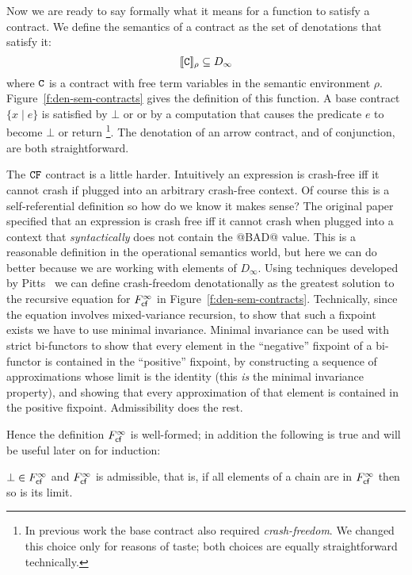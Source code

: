 Now we are ready to say formally what it means for a function to satisfy a contract.
We define the semantics of a contract as the set of denotations that satisfy it:
\[              [\![{\tt C}]\!]_\rho \subseteq D_\infty  \]
where ${\tt C}$ is a contract with free term variables in the semantic environment $\rho$.
Figure~\ref{f:den-sem-contracts} gives the definition of this function.
A base contract $\{x \mid e\}$ is satisfied by $\bot$ or
or by a computation that causes the predicate $e$ to become $\bot$
or return \True\footnote{
In previous
work \cite{xu+:contracts} the base contract also
required {\em crash-freedom}.
We changed this choice only for reasons of taste; both choices
are equally straightforward technically.}.
The denotation of an arrow contract, and of conjunction, are both straightforward.

The ${\tt CF}$ contract is a little harder. Intuitively an expression is crash-free iff it cannot
crash if plugged into an arbitrary crash-free context. Of course this is a
self-referential definition so how do we know it makes sense? The original paper
\cite{xu+:contracts} specified that an expression is crash free iff it
cannot crash when plugged into a context that {\em syntactically} does not contain the
@BAD@ value. This is a reasonable definition in the operational semantics world, but
here we can do better because we are working with elements of $D_\infty$. Using
techniques developed by Pitts~\cite{pitts-rel-domains} we can define crash-freedom denotationally as the greatest solution
to the recursive equation for $F_{\textsf{cf}}^{\infty}$ in Figure~\ref{f:den-sem-contracts}. Technically,
since the equation involves mixed-variance recursion, to show that such a fixpoint 
exists we have to use minimal invariance. Minimal invariance can be used
with strict bi-functors to show that every element in the ``negative'' fixpoint
of a bi-functor is contained in the ``positive'' fixpoint, by constructing a sequence of 
approximations whose limit is the identity (this {\em is} the minimal invariance property),
and showing that every approximation of that element is contained in the 
positive fixpoint. Admissibility does the rest.

Hence the definition $F_{\textsf{cf}}^{\infty}$ is well-formed; in addition 
the following is true and will be useful later on for induction:
\begin{lemma}\label{lem:cf-admissible}
$\bot \in F_{\textsf{cf}}^{\infty}$ and $F_{\textsf{cf}}^{\infty}$ is admissible, that is, 
if all elements of a chain are in $F_{\textsf{cf}}^{\infty}$ then so is its limit.
\end{lemma}

